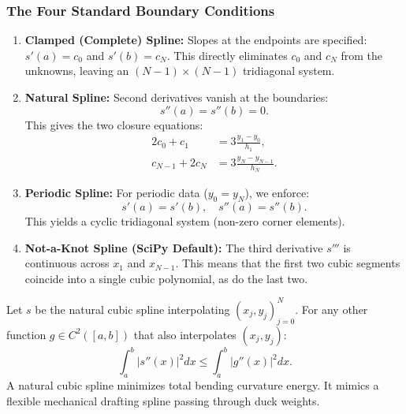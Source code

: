 \subsubsection{The Four Standard Boundary Conditions}
\begin{enumerate}
    \item \textbf{Clamped (Complete) Spline:} Slopes at the endpoints are specified: $s'(a) = c_0$ and $s'(b) = c_N$. This directly eliminates $c_0$ and $c_N$ from the unknowns, leaving an $(N-1) \times (N-1)$ tridiagonal system.
    
    \item \textbf{Natural Spline:} Second derivatives vanish at the boundaries:
    \begin{equation}
        s''(a) = s''(b) = 0.
    \end{equation}
    This gives the two closure equations:
    \begin{align}
        2 c_0 + c_1 &= 3 \frac{y_1 - y_0}{h_1}, \\
        c_{N-1} + 2 c_N &= 3 \frac{y_N - y_{N-1}}{h_N}.
    \end{align}
    
    \item \textbf{Periodic Spline:} For periodic data ($y_0 = y_N$), we enforce:
    \begin{equation}
        s'(a) = s'(b), \quad s''(a) = s''(b).
    \end{equation}
    This yields a cyclic tridiagonal system (non-zero corner elements).
    
    \item \textbf{Not-a-Knot Spline (SciPy Default):} The third derivative $s'''$ is continuous across $x_1$ and $x_{N-1}$. This means that the first two cubic segments coincide into a single cubic polynomial, as do the last two.
\end{enumerate}

\begin{theorem}
    Let $s$ be the natural cubic spline interpolating $(x_j, y_j)_{j=0}^N$. For any other function $g \in C^2([a, b])$ that also interpolates $(x_j, y_j)$:
    \begin{equation}
        \int_{a}^{b} |s''(x)|^2 dx \le \int_{a}^{b} |g''(x)|^2 dx.
    \end{equation}
    A natural cubic spline minimizes total bending curvature energy. It mimics a flexible mechanical drafting spline passing through duck weights.
\end{theorem}

